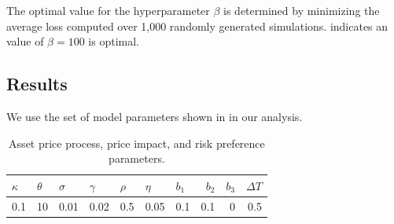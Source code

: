 \documentclass[onefignum,onetabnum]{siamonline171218}
\begin{document}
The optimal value for the hyperparameter $\beta$ is determined by minimizing the average loss  computed over 1,000 randomly generated simulations.  indicates an value of $\beta = 100$ is optimal.


\subsection{Results}

We use the set of model parameters shown in  in our analysis.
\begin{table}[h!]
  \centering
  \caption{Asset price process, price impact, and risk preference parameters.}
    \begin{tabular}{rrrrrrrrrr}
    \toprule
    \toprule
    \multicolumn{1}{l}{$\kappa$} & \multicolumn{1}{l}{$\theta$} & \multicolumn{1}{l}{$\sigma$} & 
    \multicolumn{1}{l}{$\gamma$} & \multicolumn{1}{l}{$\rho$} &
    \multicolumn{1}{l}{$\eta$} &
    \multicolumn{1}{l}{$b_1$} & $b_2$ & \multicolumn{1}{l}{$b_3$}& $\Delta T$ \\
    \midrule
    0.1   & 10    & 0.01 & 0.02 & 0.5 & 0.05   & 0.1 & 0.1 & 0 & 0.5\\
    \bottomrule
    \bottomrule
    \end{tabular}%
  \label{tab:ModelParameters}%
\end{table}%
\end{document}
